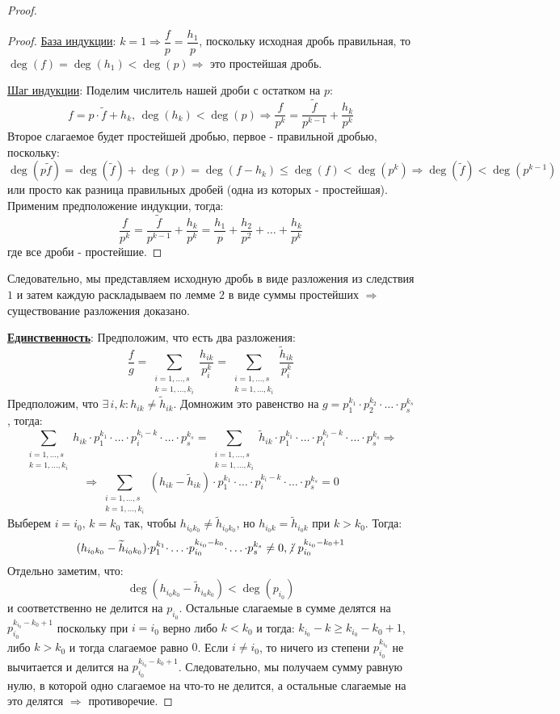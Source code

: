 \documentclass[12pt]{article}
\theoremstyle{definition}
\DeclareRobustCommand{\divby}{%
	\mathrel{\text{\vbox{\baselineskip.65ex\lineskiplimit0pt\hbox{.}\hbox{.}\hbox{.}}}}%
}
\DeclareRobustCommand{\ndivby}{\mkern-1mu\not\mathrel{\mkern4.5mu\divby}\mkern1mu}
\newcommand{\ddsum}[2]{\displaystyle\sum\limits_{#1}^{#2}}
\newcommand{\wte}[1]{\widetilde{#1}}
\begin{document}
\begin{proof}
\begin{proof}
		\uline{База индукции}: $k = 1 \Rightarrow \dfrac{f}{p} = \dfrac{h_1}{p}$, поскольку исходная дробь правильная, то $\deg(f) = \deg(h_1) < \deg(p) \Rightarrow$ это простейшая дробь.
		
		\uline{Шаг индукции}: Поделим числитель нашей дроби с остатком на $p$:
		$$
			f = p{\cdot}\wte{f} + h_k, \, \deg(h_k) < \deg(p) \Rightarrow \dfrac{f}{p^k} = \dfrac{\wte{f}}{p^{k-1}} + \dfrac{h_k}{p^k}
		$$
		Второе слагаемое будет простейшей дробью, первое - правильной дробью, поскольку:
		$$
			\deg(p\wte{f}) = \deg(\wte{f}) + \deg(p) = \deg(f - h_k) \leq \deg(f) < \deg(p^k) \Rightarrow  \deg(\wte{f}) < \deg(p^{k-1})
		$$
		или просто как разница правильных дробей (одна из которых - простейшая). Применим предположение индукции, тогда:
		$$
			\dfrac{f}{p^k} = \dfrac{\wte{f}}{p^{k-1}} + \dfrac{h_k}{p^k} = \dfrac{h_1}{p} + \dfrac{h_2}{p^2} + \dotsc + \dfrac{h_k}{p^k}
		$$
		где все дроби - простейшие.
	\end{proof}
	Следовательно, мы представляем исходную дробь в виде разложения из следствия $1$ и затем каждую раскладываем по лемме $2$ в виде суммы простейших $\Rightarrow$ существование разложения доказано.
	
	\textbf{\uline{Единственность}}: Предположим, что есть два разложения:
	$$
		\dfrac{f}{g} = \ddsum{\substack{i = 1,\dotsc,s\\k =1,\dotsc,k_i}}{} \dfrac{h_{ik}}{p_i^k} = \ddsum{\substack{i = 1,\dotsc,s\\k =1,\dotsc,k_i}}{} \dfrac{\wte{h}_{ik}}{p_i^k}
	$$
	Предположим, что $\exists \, i,k \colon h_{ik} \neq \wte{h}_{ik}$. Домножим это равенство на $g = p_1^{k_1}{\cdot}p_2^{k_2}{\cdot}\dotsc{\cdot}p_s^{k_s}$, тогда:
	$$
		\ddsum{\substack{i = 1,\dotsc,s\\k =1,\dotsc,k_i}}{} h_{ik}{\cdot}p_1^{k_1}{\cdot}\dotsc{\cdot}p_i^{k_i -k}{\cdot}\dotsc{\cdot}p_s^{k_s} = \ddsum{\substack{i = 1,\dotsc,s\\k =1,\dotsc,k_i}}{} \wte{h}_{ik}{\cdot}p_1^{k_1}{\cdot}\dotsc{\cdot}p_i^{k_i -k}{\cdot}\dotsc{\cdot}p_s^{k_s} \Rightarrow
	$$
	$$
		\Rightarrow  \ddsum{\substack{i = 1,\dotsc,s\\k =1,\dotsc,k_i}}{}(h_{ik} - \wte{h}_{ik}){\cdot}p_1^{k_1}{\cdot}\dotsc{\cdot}p_i^{k_i -k}{\cdot}\dotsc{\cdot}p_s^{k_s} = 0 
	$$
	Выберем $i = i_0, \, k = k_0$ так, чтобы $h_{i_0 k_0} \neq \wte{h}_{i_0 k_0}$, но $h_{i_0 k} = \wte{h}_{i_0 k}$ при $k > k_0$. Тогда:
	$$
		(h_{i_0k_0} - \wte{h}_{i_0k_0}){\cdot}p_1^{k_1}{\cdot}\dotsc{\cdot}p_{i_0}^{k_{i_0} -k_0}{\cdot}\dotsc{\cdot}p_s^{k_s} \neq 0, \ndivby p_{i_0}^{k_{i_0} - k_0 + 1}
	$$
	Отдельно заметим, что:
	$$
		\deg(h_{i_0k_0} - \wte{h}_{i_0k_0}) < \deg(p_{i_0})
	$$
	и соответственно не делится на $p_{i_0}$. Остальные слагаемые в сумме делятся на $p_{i_0}^{k_{i_0} - k_0 + 1}$ поскольку при $i = i_0$ верно либо $k < k_0$ и тогда: $k_{i_0} - k \geq k_{i_0} - k_0 + 1$, либо $k > k_0$ и тогда слагаемое равно $0$. Если $i \neq i_0$, то ничего из степени $p_{i_0}^{k_{i_0}}$ не вычитается и делится на $p_{i_0}^{k_{i_0} - k_0 + 1}$. Следовательно, мы получаем сумму равную нулю, в которой одно слагаемое на что-то не делится, а остальные слагаемые на это делятся $\Rightarrow$ противоречие.
\end{proof}
\end{document}
